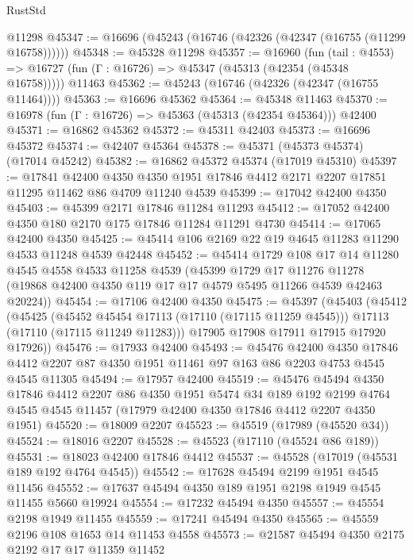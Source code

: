 \begin{lexlean}{RustStd}
\begin{coremodule}
    @11298
@45347 := @16696 (@45243 (@16746 (@42326 (@42347 (@16755 (@11299 @16758))))))
@45348 := @45328 @11298
@45357 := @16960
    (fun (tail : @4553) => @16727 (fun (Γ : @16726) => @45347 (@45313 (@42354 (@45348 @16758)))))
    @11463
@45362 := @45243 (@16746 (@42326 (@42347 (@16755 @11464))))
@45363 := @16696 @45362
@45364 := @45348 @11463
@45370 := @16978 (fun (Γ : @16726) => @45363 (@45313 (@42354 @45364))) @42400
@45371 := @16862 @45362
@45372 := @45311 @42403
@45373 := @16696 @45372
@45374 := @42407 @45364
@45378 := @45371 (@45373 @45374) (@17014 @45242)
@45382 := @16862 @45372 @45374 (@17019 @45310)
@45397 := @17841
    @42400
    @4350
    @4350
    @1951
    @17846
    @4412
    @2171
    @2207
    @17851
    @11295
    @11462
    @86
    @4709
    @11240
    @4539
@45399 := @17042 @42400 @4350
@45403 := @45399 @2171 @17846 @11284 @11293
@45412 := @17052 @42400 @4350 @180 @2170 @175 @17846 @11284 @11291 @4730
@45414 := @17065 @42400 @4350
@45425 := @45414 @106 @2169 @22 @19 @4645 @11283 @11290 @4533 @11248 @4539 @42448
@45452 := @45414
    @1729
    @108
    @17
    @14
    @11280
    @4545
    @4558
    @4533
    @11258
    @4539
    (@45399
      @1729
      @17
      @11276
      @11278
      (@19868 @42400 @4350 @119 @17 @17 @4579 @5495 @11266 @4539 @42463 @20224))
@45454 := @17106 @42400 @4350
@45475 := @45397
    (@45403
      (@45412
        (@45425
          (@45452 @45454 @17113 (@17110 (@17115 @11259 @4545)))
          @17113
          (@17110 (@17115 @11249 @11283)))
        @17905
        @17908
        @17911
        @17915
        @17920
        @17926))
@45476 := @17933 @42400
@45493 := @45476
    @42400
    @4350
    @17846
    @4412
    @2207
    @87
    @4350
    @1951
    @11461
    @97
    @163
    @86
    @2203
    @4753
    @4545
    @4545
    @11305
@45494 := @17957 @42400
@45519 := @45476
    @45494
    @4350
    @17846
    @4412
    @2207
    @86
    @4350
    @1951
    @5474
    @34
    @189
    @192
    @2199
    @4764
    @4545
    @4545
    @11457
    (@17979 @42400 @4350 @17846 @4412 @2207 @4350 @1951)
@45520 := @18009 @2207
@45523 := @45519 (@17989 (@45520 @34))
@45524 := @18016 @2207
@45528 := @45523 (@17110 (@45524 @86 @189))
@45531 := @18023 @42400 @17846 @4412
@45537 := @45528 (@17019 (@45531 @189 @192 @4764 @4545))
@45542 := @17628 @45494 @2199 @1951 @4545 @11456
@45552 := @17637 @45494 @4350 @189 @1951 @2198 @1949 @4545 @11455 @5660 @19924
@45554 := @17232 @45494 @4350
@45557 := @45554 @2198 @1949 @11455
@45559 := @17241 @45494 @4350
@45565 := @45559 @2196 @108 @1653 @14 @11453 @4558
@45573 := @21587 @45494 @4350 @2175 @2192 @17 @17 @11359 @11452

\end{coremodule}
\end{lexlean}
